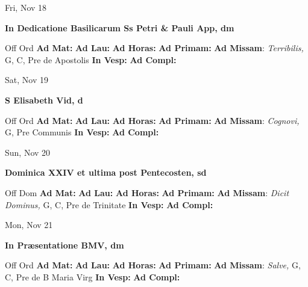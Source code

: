 \documentclass[10pt]{article}
\begin{document}
\begin{minipage}{3.5in}
\vspace{2em}\begin{center}
Fri, Nov 18
\end{center}\textbf{ \large In Dedicatione Basilicarum Ss Petri \& Pauli App, \textnormal{\normalsize dm}}
\begin{justify}
Off Ord
\textbf{Ad Mat: }
\textbf{Ad Lau: }
\textbf{Ad Horas: }
\textbf{Ad Primam: }
\textbf{Ad Missam}: \textit{Terribilis,} G, C, Pre de Apostolis
\textbf{In Vesp: }
\textbf{Ad Compl: }\end{justify}
\end{minipage}



\begin{minipage}{3.5in}
\vspace{2em}\begin{center}
Sat, Nov 19
\end{center}\textbf{ \large S Elisabeth Vid, \textnormal{\normalsize d}}
\begin{justify}
Off Ord
\textbf{Ad Mat: }
\textbf{Ad Lau: }
\textbf{Ad Horas: }
\textbf{Ad Primam: }
\textbf{Ad Missam}: \textit{Cognovi,} G, Pre Communis
\textbf{In Vesp: }
\textbf{Ad Compl: }\end{justify}
\end{minipage}



\begin{minipage}{3.5in}
\vspace{2em}\begin{center}
Sun, Nov 20
\end{center}\textbf{ \large Dominica XXIV et ultima post Pentecosten, \textnormal{\normalsize sd}}
\begin{justify}
Off Dom
\textbf{Ad Mat: }
\textbf{Ad Lau: }
\textbf{Ad Horas: }
\textbf{Ad Primam: }
\textbf{Ad Missam}: \textit{Dicit Dominus,} G, C, Pre de Trinitate
\textbf{In Vesp: }
\textbf{Ad Compl: }\end{justify}
\end{minipage}



\begin{minipage}{3.5in}
\vspace{2em}\begin{center}
Mon, Nov 21
\end{center}\textbf{ \large In Præsentatione BMV, \textnormal{\normalsize dm}}
\begin{justify}
Off Ord
\textbf{Ad Mat: }
\textbf{Ad Lau: }
\textbf{Ad Horas: }
\textbf{Ad Primam: }
\textbf{Ad Missam}: \textit{Salve,} G, C, Pre de B Maria Virg
\textbf{In Vesp: }
\textbf{Ad Compl: }\end{justify}
\end{minipage}
\end{document}
